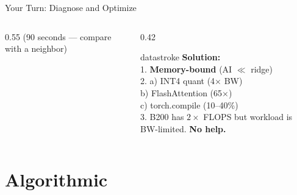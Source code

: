 \documentclass[aspectratio=169, 12pt]{beamer}
\begin{document}
\begin{frame}{Your Turn: Diagnose and Optimize}
\begin{columns}[T]
\begin{column}{0.55\textwidth}
    {\scriptsize\textcolor{midgray}{(90 seconds --- compare with a neighbor)}}
  \end{column}
  \begin{column}{0.42\textwidth}
    \pause
    \begin{mlsyscard}{datastroke}
    {\scriptsize\textbf{Solution:}\\[0.05cm]
    1. \textcolor{computestroke}{\textbf{Memory-bound}} (AI $\ll$ ridge)\\[0.05cm]
    2. a) INT4 quant (4$\times$ BW)\\
    \quad b) FlashAttention (65$\times$)\\
    \quad c) torch.compile (10--40\%)\\[0.05cm]
    3. B200 has $2\times$ FLOPS but workload is BW-limited. \textbf{No help.}
    }
    \end{mlsyscard}
  \end{column}
\end{columns}

\end{frame}

\section{Algorithmic}
\end{document}
